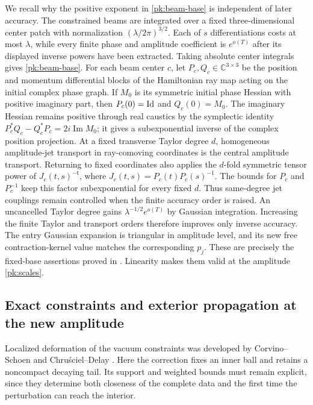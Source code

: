 We recall why the positive exponent in \eqref{pk:beam-base} is
independent of later accuracy. The constrained beams are integrated
over a fixed three-dimensional center patch with normalization
$(\lambda/2\pi)^{3/2}$. Each of $s$ differentiations costs at most
$\lambda$, while every finite phase and amplitude coefficient is
$e^{o(T)}$ after its displayed inverse powers have been extracted.
Taking absolute center integrals gives \eqref{pk:beam-base}.
For each beam center $c$, let $P_c,Q_c\in\mathbb C^{3\times3}$ be
the position and momentum differential blocks of the Hamiltonian ray
map acting on the initial complex phase graph. If $M_0$ is its
symmetric initial phase Hessian with positive imaginary part, then
$P_c(0)=\mathrm{Id}$ and $Q_c(0)=M_0$. The imaginary Hessian remains positive
through real caustics by the symplectic identity
$P_c^*Q_c-Q_c^*P_c=2i\operatorname{Im}M_0$; it gives a
subexponential inverse of the complex position projection.
At a fixed transverse Taylor degree $d$, homogeneous amplitude-jet
transport in ray-comoving coordinates is the central amplitude
transport. Returning to fixed coordinates also applies the $d$-fold
symmetric tensor power of $J_c(t,s)^{-{\mathsf t}}$, where
$J_c(t,s)=P_c(t)P_c(s)^{-1}$. The bounds for $P_c$ and $P_c^{-1}$
keep this factor subexponential for every fixed $d$. Thus same-degree
jet couplings remain controlled when the finite accuracy order is raised.
An uncancelled Taylor degree gains
$\lambda^{-1/2}e^{o(T)}$ by Gaussian integration. Increasing the
finite Taylor and transport orders therefore improves only
inverse accuracy. The entry Gaussian expansion is triangular in
amplitude level, and its new free contraction-kernel value matches
the corresponding $p_j$. These are precisely the fixed-base
assertions proved in \cite[]{KerrCTwo}. Linearity makes
them valid at the amplitude \eqref{pk:scales}.

\subsection{Exact constraints and exterior propagation at the new amplitude}

Localized deformation of the vacuum constraints was developed by
Corvino--Schoen and Chru\'sciel--Delay
\cite{CorvinoSchoen2006,ChruscielDelay2003}. Here the correction fixes
an inner ball and retains a noncompact decaying tail. Its support and
weighted bounds must remain explicit, since they determine both
closeness of the complete data and the first time the perturbation can
reach the interior.

